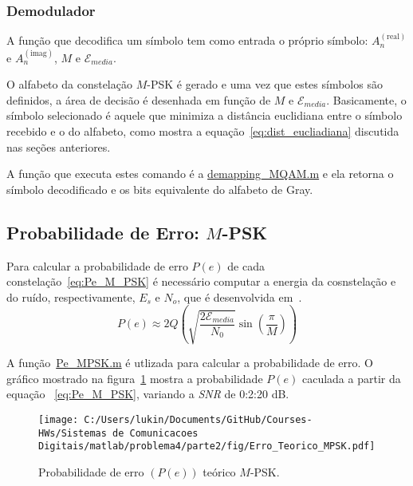 \subsubsection{Demodulador}

A função que decodifica um símbolo tem como entrada o próprio símbolo: $A_n^{(\text{real})}$ e $A_n^{(\text{imag})}$, $M$ e $\mathcal{E}_{media}$. 

O alfabeto da constelação $M$-PSK é gerado e uma vez que estes símbolos são definidos, a área de decisão é desenhada em função de $M$ e $\mathcal{E}_{media}$. Basicamente, o símbolo selecionado é aquele que minimiza a distância euclidiana entre o símbolo recebido e o do alfabeto, como mostra a equação~\ref{eq:dist_eucliadiana} discutida nas seções anteriores.

A função que executa estes comando é a \href{https://raw.githubusercontent.com/lucasabdalah/Courses-HWs/SCD/Sistemas%20de%20Comunicacoes%20Digitais/matlab/problema1/demapping_MQAM.m}{\colorbox{gray!20}{\color{red}demapping\_MQAM.m}} e ela retorna o símbolo decodificado e os bits equivalente do alfabeto de Gray. 

\subsection{Probabilidade de Erro: \texorpdfstring{$M$}{M}-PSK}

Para calcular a probabilidade de erro $P(e)$ de cada constelação~\ref{eq:Pe_M_PSK} é necessário computar a energia da cosnstelação e do ruído, respectivamente, $E_s$ e $N_o$, que é desenvolvida em~\cite{Cecilio}.
\begin{equation}
    P(e) \approx 2Q\left( \sqrt{\frac{2 \mathcal{E}_{media}}{N_0}} \sin\left(\frac{\pi}{M}\right)\right)
    \label{eq:Pe_M_PSK}
\end{equation}

A função~\href{https://raw.githubusercontent.com/lucasabdalah/Courses-HWs/SCD/Sistemas%20de%20Comunicacoes%20Digitais/matlab/problema4/parte2/Pe_MPSK.m}{\colorbox{gray!20}{\color{red}Pe\_MPSK.m}} é utlizada para calcular a probabilidade de erro. O gráfico mostrado na figura~\ref{fig:Erro_Teorico_MPSK} mostra a probabilidade $P(e)$ caculada a partir da equação ~\ref{eq:Pe_M_PSK}, variando a \textit{SNR} de 0:2:20 dB.

\begin{figure}[!ht]
    \centering
    \texttt{[image: C:/Users/lukin/Documents/GitHub/Courses-HWs/Sistemas de Comunicacoes Digitais/matlab/problema4/parte2/fig/Erro\_Teorico\_MPSK.pdf]}
    \caption{Probabilidade de erro $(P(e))$ teórico $M$-PSK.}
    \label{fig:Erro_Teorico_MPSK}
\end{figure}

